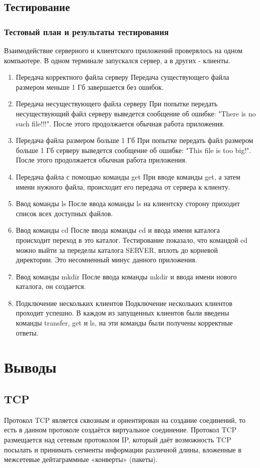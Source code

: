 \documentclass[12pt,a4paper]{report}
\begin{document}
\section{Тестирование}
\subsection{Тестовый план и результаты тестирования}
Взаимодействие серверного и клиентского приложений проверялось на одном компьютере. В одном терминале запускался сервер, а в других - клиенты.
\begin{enumerate}
\item{Передача корректного файла серверу}
Передача существующего файла размером меньше 1 Гб завершается без ошибок. 
\item{Передача несуществующего файла серверу}
При попытке передать несуществующий файл серверу выведется сообщение об ошибке: "There is no such file!!!". После этого продолжается обычная работа приложения.
\item{Передача файла размером больше 1 Гб}
При попытке передать файл размером больше 1 Гб серверу выведется сообщение об ошибке: "This file is too big!". После этого продолжается обычная работа приложения. 
\item{Передача файла с помощью команды get}
При вводе команды get, а затем имени нужного файла, происходит его передача от сервера к клиенту.
\item{Ввод команды ls}
После ввода команды ls на клиентску сторону приходит список всех доступных файлов.
\item{Ввод команды cd}
После ввода команды cd и ввода имени каталога происходит переход в это каталог. Тестирование показало, что командой cd можно выйти за переделы каталога SERVER, вплоть до корневой директории. Это несомненный минус данного приложения.
\item{Ввод команды mkdir}
После ввода команды mkdir и ввода имени нового каталога, он создается.
\item{Подключение нескольких клиентов}
Подключение нескольких клиентов проходит успешно. 
В каждом из запущенных клиентов были введены команды transfer, get и ls, на эти команды были получены корректные ответы.
\end{enumerate}
\chapter{Выводы}
\section{TCP}
  Протокол TCP является сквозным и ориентирован на создание соединений, то есть в данном протоколе создаётся виртуальное соединение. Протокол TCP размещается над сетевым протоколом IP, который даёт возможность TCP посылать и принимать сегменты информации различной длины, вложенные в межсетевые дейтаграммные «конверты» (пакеты).
\end{document}
